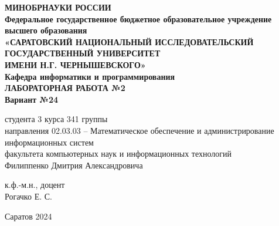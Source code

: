 \documentclass[a4paper,12pt]{article}
\begin{document}
\begin{center}
    \textbf{\LARGE МИНОБРНАУКИ РОССИИ} \\[1em]
    \textbf{\large Федеральное государственное бюджетное образовательное учреждение} \\[1em]
    \textbf{\large высшего образования} \\[1em]
    \textbf{\large «САРАТОВСКИЙ НАЦИОНАЛЬНЫЙ ИССЛЕДОВАТЕЛЬСКИЙ} \\[1em]
    \textbf{\large ГОСУДАРСТВЕННЫЙ УНИВЕРСИТЕТ} \\[1em]
    \textbf{\large ИМЕНИ Н.Г. ЧЕРНЫШЕВСКОГО»} \\[2em]
    
    \textbf{\large Кафедра информатики и программирования} \\[2em]
    
    \textbf{\Large ЛАБОРАТОРНАЯ РАБОТА №2} \\[0.5em]
    
    \textbf{\large Вариант №24} \\[2em]
\end{center}

\vfill

\begin{flushleft}
    студента 3 курса 341 группы \\[0.5em]
    направления 02.03.03 – Математическое обеспечение и администрирование \\[1em]
    информационных систем \\[2em]
    
    факультета компьютерных наук и информационных технологий \\[2em]
    
    Филиппенко Дмитрия Александровича \\[2em]
\end{flushleft}

\begin{flushright}
    к.ф.-м.н., доцент \\[1em]
    
    Рогачко Е. С. \\[2em]
\end{flushright}

\begin{center}
    Саратов 2024
\end{center}


\newpage
\end{document}
